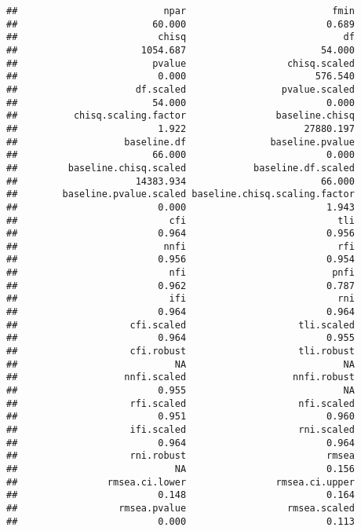\documentclass[
]{article}
\begin{document}
\begin{verbatim}
##                          npar                          fmin 
##                        60.000                         0.689 
##                         chisq                            df 
##                      1054.687                        54.000 
##                        pvalue                  chisq.scaled 
##                         0.000                       576.540 
##                     df.scaled                 pvalue.scaled 
##                        54.000                         0.000 
##          chisq.scaling.factor                baseline.chisq 
##                         1.922                     27880.197 
##                   baseline.df               baseline.pvalue 
##                        66.000                         0.000 
##         baseline.chisq.scaled            baseline.df.scaled 
##                     14383.934                        66.000 
##        baseline.pvalue.scaled baseline.chisq.scaling.factor 
##                         0.000                         1.943 
##                           cfi                           tli 
##                         0.964                         0.956 
##                          nnfi                           rfi 
##                         0.956                         0.954 
##                           nfi                          pnfi 
##                         0.962                         0.787 
##                           ifi                           rni 
##                         0.964                         0.964 
##                    cfi.scaled                    tli.scaled 
##                         0.964                         0.955 
##                    cfi.robust                    tli.robust 
##                            NA                            NA 
##                   nnfi.scaled                   nnfi.robust 
##                         0.955                            NA 
##                    rfi.scaled                    nfi.scaled 
##                         0.951                         0.960 
##                    ifi.scaled                    rni.scaled 
##                         0.964                         0.964 
##                    rni.robust                         rmsea 
##                            NA                         0.156 
##                rmsea.ci.lower                rmsea.ci.upper 
##                         0.148                         0.164 
##                  rmsea.pvalue                  rmsea.scaled 
##                         0.000                         0.113 

\end{verbatim}
\end{document}
